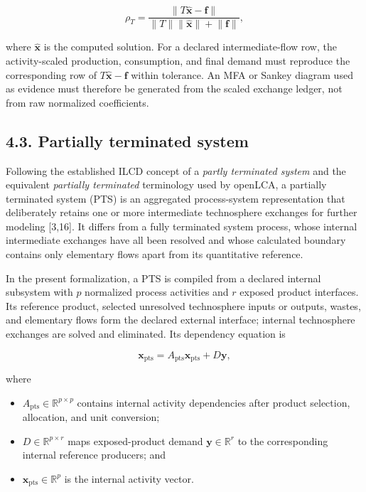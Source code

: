 \documentclass[
  10pt,
  a4paper,
  DIV=11,
  numbers=noendperiod]{scrartcl}
\providecommand{\tightlist}{%
  \setlength{\itemsep}{0pt}\setlength{\parskip}{0pt}}
\begin{document}
\[
\rho_T=
\frac{\lVert T\widehat{\mathbf{x}}-\mathbf{f}\rVert}
{\lVert T\rVert\lVert\widehat{\mathbf{x}}\rVert+\lVert\mathbf{f}\rVert},
\tag{7}
\]

where \(\widehat{\mathbf{x}}\) is the computed solution. For a declared
intermediate-flow row, the activity-scaled production, consumption, and
final demand must reproduce the corresponding row of
\(T\widehat{\mathbf{x}}-\mathbf f\) within tolerance. An MFA or Sankey
diagram used as evidence must therefore be generated from the scaled
exchange ledger, not from raw normalized coefficients.

\subsection{4.3. Partially terminated
system}\label{partially-terminated-system}

Following the established ILCD concept of a \emph{partly terminated
system} and the equivalent \emph{partially terminated} terminology used
by openLCA, a partially terminated system (PTS) is an aggregated
process-system representation that deliberately retains one or more
intermediate technosphere exchanges for further modeling {[}3,16{]}. It
differs from a fully terminated system process, whose internal
intermediate exchanges have all been resolved and whose calculated
boundary contains only elementary flows apart from its quantitative
reference.

In the present formalization, a PTS is compiled from a declared internal
subsystem with \(p\) normalized process activities and \(r\) exposed
product interfaces. Its reference product, selected unresolved
technosphere inputs or outputs, wastes, and elementary flows form the
declared external interface; internal technosphere exchanges are solved
and eliminated. Its dependency equation is

\[
\mathbf{x}_{\mathrm{pts}}
=A_{\mathrm{pts}}\mathbf{x}_{\mathrm{pts}}+D\mathbf{y},
\tag{8}
\]

where

\begin{itemize}
\tightlist
\item
  \(A_{\mathrm{pts}}\in\mathbb{R}^{p\times p}\) contains internal
  activity dependencies after product selection, allocation, and unit
  conversion;
\item
  \(D\in\mathbb{R}^{p\times r}\) maps exposed-product demand
  \(\mathbf y\in\mathbb{R}^{r}\) to the corresponding internal reference
  producers; and
\item
  \(\mathbf{x}_{\mathrm{pts}}\in\mathbb{R}^{p}\) is the internal
  activity vector.
\end{itemize}
\end{document}
